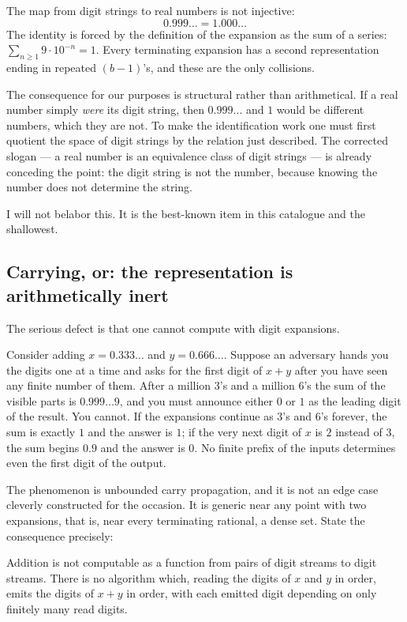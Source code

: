 \documentclass{essay}
\begin{document}
The map from digit strings to real numbers is not injective:
\[ 0.999\ldots = 1.000\ldots \]
The identity is forced by the definition of the expansion as the sum of a
series: \(\sum_{n\ge1} 9 \cdot 10^{-n} = 1\). Every terminating expansion has a
second representation ending in repeated \((b-1)\)'s, and these are the only
collisions.

The consequence for our purposes is structural rather than arithmetical. If a
real number simply \emph{were} its digit string, then \(0.999\ldots\) and \(1\)
would be different numbers, which they are not. To make the identification work
one must first quotient the space of digit strings by the relation just
described. The corrected slogan --- a real number is an equivalence class of
digit strings --- is already conceding the point: the digit string is not the
number, because knowing the number does not determine the string.

I will not belabor this. It is the best-known item in this catalogue and the
shallowest.

\subsection{Carrying, or: the representation is arithmetically inert}

The serious defect is that one cannot compute with digit expansions.

Consider adding \(x = 0.333\ldots\) and \(y = 0.666\ldots\). Suppose an adversary
hands you the digits one at a time and asks for the first digit of \(x+y\) after
you have seen any finite number of them. After a million \(3\)'s and a million
\(6\)'s the sum of the visible parts is \(0.999\ldots9\), and you must announce
either \(0\) or \(1\) as the leading digit of the result. You cannot. If the
expansions continue as \(3\)'s and \(6\)'s forever, the sum is exactly \(1\) and the
answer is \(1\); if the very next digit of \(x\) is \(2\) instead of \(3\), the sum
begins \(0.9\) and the answer is \(0\). No finite prefix of the inputs determines
even the first digit of the output.

The phenomenon is unbounded carry propagation, and it is not an edge case
cleverly constructed for the occasion. It is generic near any point with two
expansions, that is, near every terminating rational, a dense set. State the
consequence precisely:

\begin{proposition}
  Addition is not computable as a function from pairs of digit streams to digit
  streams. There is no algorithm which, reading the digits of \(x\) and \(y\) in
  order, emits the digits of \(x+y\) in order, with each emitted digit depending on
  only finitely many read digits.
\end{proposition}
\end{document}
